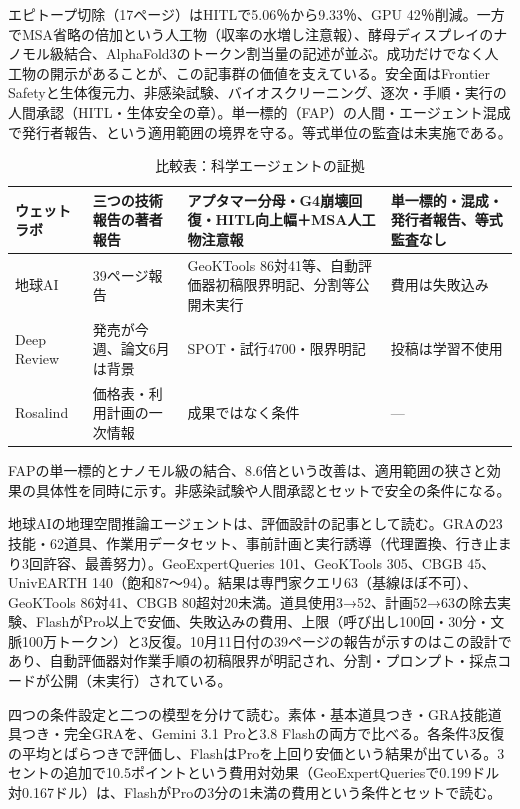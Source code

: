 \documentclass[lualatex,a4paper,10pt]{jlreq}
\begin{document}
エピトープ切除（17ページ）はHITLで5.06％から9.33％、GPU 42％削減。一方でMSA省略の倍加という人工物（収率の水増し注意報）、酵母ディスプレイのナノモル級結合、AlphaFold3のトークン割当量の記述が並ぶ。成功だけでなく人工物の開示があることが、この記事群の価値を支えている。安全面はFrontier Safetyと生体復元力、非感染試験、バイオスクリーニング、逐次・手順・実行の人間承認（HITL・生体安全の章）。単一標的（FAP）の人間・エージェント混成で発行者報告、という適用範囲の境界を守る。等式単位の監査は未実施である。
\cite{B43,B44,B45,B46}


\begin{table}[htbp]\centering\footnotesize
\caption{比較表：科学エージェントの証拠}
\begin{tabularx}{0.96\linewidth}{@{}lXXX@{}}
\toprule
ウェットラボ & 三つの技術報告の著者報告 & アプタマー分母・G4崩壊回復・HITL向上幅＋MSA人工物注意報 & 単一標的・混成・発行者報告、等式監査なし \cite{B46,B44,B45,B43} \\
\midrule
地球AI & 39ページ報告 & GeoKTools 86対41等、自動評価器初稿限界明記、分割等公開未実行 & 費用は失敗込み \cite{B47,B48} \\
\midrule
Deep Review & 発売が今週、論文6月は背景 & SPOT・試行4700・限界明記 & 投稿は学習不使用 \cite{B50,B49} \\
\midrule
Rosalind & 価格表・利用計画の一次情報 & 成果ではなく条件 & --- \cite{B51,B52} \\
\bottomrule
\end{tabularx}
\end{table}

FAPの単一標的とナノモル級の結合、8.6倍という改善は、適用範囲の狭さと効果の具体性を同時に示す。非感染試験や人間承認とセットで安全の条件になる。
\cite{B43,B44,B45,B46}


地球AIの地理空間推論エージェントは、評価設計の記事として読む。GRAの23技能・62道具、作業用データセット、事前計画と実行誘導（代理置換、行き止まり3回許容、最善努力）。GeoExpertQueries 101、GeoKTools 305、CBGB 45、UnivEARTH 140（飽和87〜94）。結果は専門家クエリ63（基線ほぼ不可）、GeoKTools 86対41、CBGB 80超対20未満。道具使用3→52、計画52→63の除去実験、FlashがPro以上で安価、失敗込みの費用、上限（呼び出し100回・30分・文脈100万トークン）と3反復。10月11日付の39ページの報告が示すのはこの設計であり、自動評価器対作業手順の初稿限界が明記され、分割・プロンプト・採点コードが公開（未実行）されている。
\cite{B47,B48}


四つの条件設定と二つの模型を分けて読む。素体・基本道具つき・GRA技能道具つき・完全GRAを、Gemini 3.1 Proと3.8 Flashの両方で比べる。各条件3反復の平均とばらつきで評価し、FlashはProを上回り安価という結果が出ている。3セントの追加で10.5ポイントという費用対効果（GeoExpertQueriesで0.199ドル対0.167ドル）は、FlashがProの3分の1未満の費用という条件とセットで読む。
\cite{B47,B48}
\end{document}
